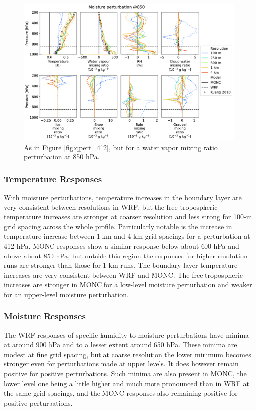 \documentclass[draft]{agujournal2019}
\begin{document}
\begin{figure}[pth]
    \noindent\includegraphics[width=\textwidth]{figures/pert_diffs_q_0.0002_@850}
    \caption{As in Figure \ref{fig:qpert_412}, but for a water vapor mixing
    ratio perturbation at 850 hPa.}
    \label{fig:qpert_850}
\end{figure}

\subsubsection{Temperature Responses}

With moisture perturbations, temperature increases in the boundary layer are
very consistent between resolutions in WRF, but the free tropospheric
temperature increases are stronger at coarser resolution and less strong for 100-m grid spacing across the whole profile. Particularly notable is the increase in
temperature increase between 1 km and 4 km grid spacings for a perturbation at
412 hPa. MONC responses show a similar response below about 600 hPa and above
about 850 hPa, but outside this region the responses for higher resolution runs
are stronger than those for 1-km runs. The boundary-layer temperature increases
are very consistent between WRF and MONC. The free-tropospheric increases are
stronger in MONC for a low-level moisture perturbation and weaker for an
upper-level moisture perturbation.

\subsubsection{Moisture Responses}

The WRF responses of specific humidity to moisture perturbations have minima at
around 900 hPa and to a lesser extent around 650 hPa. These minima are modest at
fine grid spacing, but at coarse resolution the lower minimum becomes stronger
even for perturbations made at upper levels. It does however remain positive for positive perturbations. Such minima are also present in MONC, the
lower level one being a little higher and much more pronounced than in WRF at
the same grid spacings, and the MONC responses also remaining positive for
positive perturbations.
\end{document}
